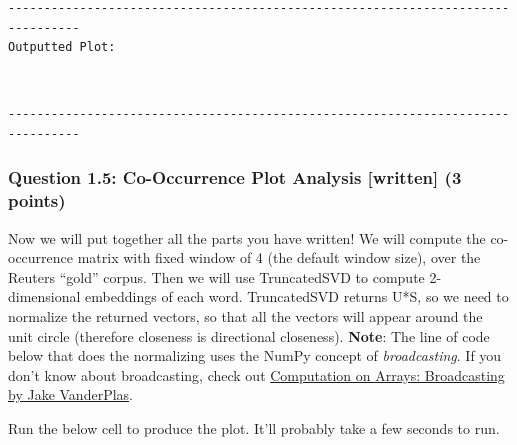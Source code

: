 \documentclass[11pt]{article}
\begin{document}
    \begin{Verbatim}[commandchars=\\\{\}]
--------------------------------------------------------------------------------
Outputted Plot:
    \end{Verbatim}

    \begin{center}
    \end{center}
    { \hspace*{\fill} \\}
    
    \begin{Verbatim}[commandchars=\\\{\}]
--------------------------------------------------------------------------------
    \end{Verbatim}

    \hypertarget{question-1.5-co-occurrence-plot-analysis-written-3-points}{%
\subsubsection{Question 1.5: Co-Occurrence Plot Analysis {[}written{]}
(3
points)}\label{question-1.5-co-occurrence-plot-analysis-written-3-points}}

Now we will put together all the parts you have written! We will compute
the co-occurrence matrix with fixed window of 4 (the default window
size), over the Reuters ``gold'' corpus. Then we will use TruncatedSVD
to compute 2-dimensional embeddings of each word. TruncatedSVD returns
U*S, so we need to normalize the returned vectors, so that all the
vectors will appear around the unit circle (therefore closeness is
directional closeness). \textbf{Note}: The line of code below that does
the normalizing uses the NumPy concept of \emph{broadcasting}. If you
don't know about broadcasting, check out
\href{https://jakevdp.github.io/PythonDataScienceHandbook/02.05-computation-on-arrays-broadcasting.html}{Computation
on Arrays: Broadcasting by Jake VanderPlas}.

Run the below cell to produce the plot. It'll probably take a few
seconds to run.
\end{document}
